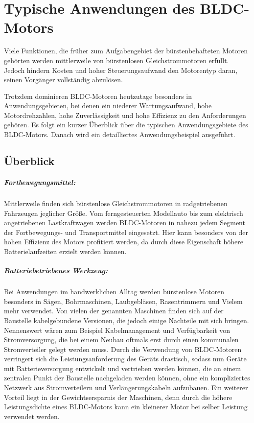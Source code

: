 \chapter{Typische Anwendungen des BLDC-Motors}

Viele Funktionen, die früher zum Aufgabengebiet der bürstenbehafteten Motoren gehörten werden mittlerweile von bürstenlosen Gleichstrommotoren erfüllt. Jedoch hindern Kosten und hoher Steuerungsaufwand den Motorentyp daran, seinen Vorgänger vollständig abzulösen.

Trotzdem dominieren BLDC-Motoren heutzutage besonders in Anwendungsgebieten, bei denen ein niederer Wartungsaufwand, hohe Motordrehzahlen, hohe Zuverlässigkeit und hohe Effizienz zu den Anforderungen gehören. Es folgt ein kurzer Überblick über die typischen Anwendungsgebiete des BLDC-Motors. Danach wird ein detailliertes Anwendungsbeispiel ausgeführt.

\section{Überblick}

\paragraph{Fortbewegungsmittel:} Mittlerweile finden sich bürstenlose Gleichstrommotoren in radgetriebenen Fahrzeugen jeglicher Größe. Vom ferngesteuerten Modellauto bis zum elektrisch angetriebenen Lastkraftwagen werden BLDC-Motoren in nahezu jedem Segment der Fortbewegungs- und Transportmittel eingesetzt. Hier kann besonders von der hohen Effizienz des Motors profitiert werden, da durch diese Eigenschaft höhere Batterielaufzeiten erzielt werden können.

\paragraph{Batteriebetriebenes Werkzeug:} Bei Anwendungen im handwerklichen Alltag werden bürstenlose Motoren besonders in Sägen, Bohrmaschinen, Laubgebläsen, Rasentrimmern und Vielem mehr verwendet. Von vielen der genannten Maschinen finden sich auf der Baustelle kabelgebundene Versionen, die jedoch einige Nachteile mit sich bringen. Nennenswert wären zum Beispiel Kabelmanagement und Verfügbarkeit von Stromversorgung, die bei einem Neubau oftmals erst durch einen kommunalen Stromverteiler gelegt werden muss. Durch die Verwendung von BLDC-Motoren verringert sich die Leistungsanforderung des Geräts drastisch, sodass nun Geräte mit Batterieversorgung entwickelt und vertrieben werden können, die an einem zentralen Punkt der Baustelle nachgeladen werden können, ohne ein kompliziertes Netzwerk aus Stromverteilern und Verlängerungskabeln aufzubauen. Ein weiterer Vorteil liegt in der Gewichtsersparnis der Maschinen, denn durch die höhere Leistungsdichte eines BLDC-Motors kann ein kleinerer Motor bei selber Leistung verwendet werden.

